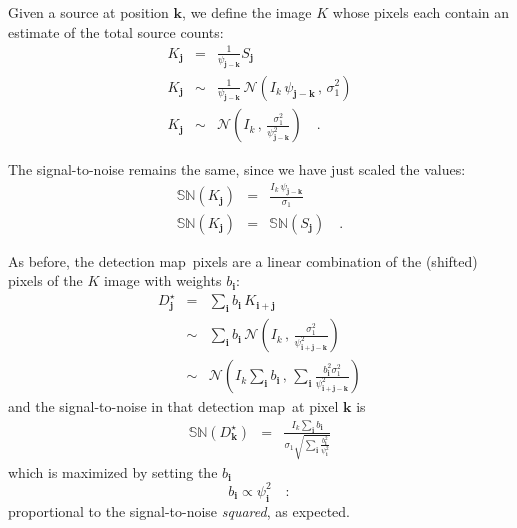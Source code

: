 \documentclass[11pt,letterpaper,linenumbers]{aastex7}
\newcommand{\detmap}{detection map}
\newcommand{\drawnfrom}{\sim}
\newcommand{\gaussianN}{\mathcal{N}}
\newcommand{\gaussian}[1]{\gaussianN\!\left(#1\right)}
\newcommand{\psf}{\psi}
\newcommand{\psfat}[1]{\psf_{#1}}
\newcommand{\snr}[1]{\mathbb{SN}(#1)}
\renewcommand{\vec}[1]{\boldsymbol{#1}}
\newcommand{\ivec}{\vec{i}}
\newcommand{\jvec}{\vec{j}}
\newcommand{\kvec}{\vec{k}}
\begin{document}
Given a source at position $\kvec$, we define the image $K$ whose
pixels each contain an estimate of the total source counts:
\begin{eqnarray}
  K_{\jvec} &=& \frac{1}{\psfat{\jvec-\kvec}} S_{\jvec}  \\
  K_{\jvec} &\drawnfrom& \frac{1}{\psfat{\jvec-\kvec}} \, \gaussian{I_k \, \psfat{\jvec-\kvec}\, , \, \sigma_1^2} \\
  K_{\jvec} &\drawnfrom& \gaussian{I_k \, , \, \frac{\sigma_1^2}{\psfat{\jvec-\kvec}^2}} \quad .
\end{eqnarray}

The signal-to-noise remains the same, since we have just scaled the
values:
\begin{eqnarray}
\snr{K_{\jvec}} &=& \frac{I_k \, \psfat{\jvec-\kvec}}{\sigma_1} \\
\snr{K_{\jvec}} &=& \snr{S_{\jvec}} \quad .
\end{eqnarray}


As before, the \detmap\ pixels are a linear combination of the
(shifted) pixels of the $K$ image with weights $b_{\ivec}$:
\begin{eqnarray}
D_{\jvec}^\star &=& \sum_{\ivec} b_{\ivec} \, K_{\ivec+\jvec} \\
&\drawnfrom& \sum_{\ivec} b_{\ivec} \, \gaussian{I_k \,,\, \frac{\sigma_1^2}{\psfat{\ivec+\jvec-\kvec}^2}} \\
&\drawnfrom& \gaussian{I_k \sum_{\ivec} b_{\ivec} \,,\, \sum_{\ivec} \frac{b_{\ivec}^2 \sigma_1^2}{\psfat{\ivec+\jvec-\kvec}^2}}
\end{eqnarray}
and the signal-to-noise in that \detmap\ at pixel $\kvec$ is
\begin{eqnarray}
\snr{D_{\kvec}^\star} &=& \frac{I_k \sum_{\ivec} b_{\ivec}}{\sigma_1 \sqrt{\sum_{\ivec} \frac{b_{\ivec}^2}{\psfat{\ivec}^2}}}
\end{eqnarray}
which is maximized by setting the $b_{\ivec}$
\begin{equation}
b_{\ivec} \propto \psfat{\ivec}^2 \quad :
\end{equation}
proportional to the signal-to-noise \emph{squared}, as expected.

%
%
%
%
\end{document}
